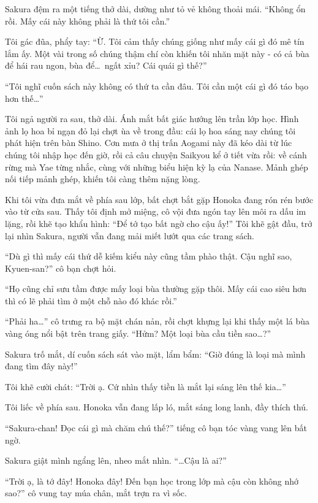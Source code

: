 \documentclass[../main.tex]{subfiles}
\begin{document}
Sakura đệm ra một tiếng thở dài, dường như tỏ vẻ không thoải mái. ``Không ổn rồi. Mấy cái này không phải là thứ tôi cần.''

Tôi gác đũa, phẩy tay: ``Ừ. Tôi cảm thấy chúng giống như mấy cái gì đó mê tín lắm ấy. Một vài trong số chúng thậm chí còn khiến tôi nhăn mặt này - có cả bùa để hái rau ngon, bùa để\dots\ ngất xỉu? Cái quái gì thế?''

``Tôi nghĩ cuốn sách này không có thứ ta cần đâu. Tôi cần một cái gì đó táo bạo hơn thế\dots''

Tôi ngả người ra sau, thở dài. Ánh mắt bất giác hướng lên trần lớp học. Hình ảnh lọ hoa bỉ ngạn đỏ lại chợt ùa về trong đầu: cái lọ hoa sáng nay chúng tôi phát hiện trên bàn Shino. Cơn mưa ở thị trấn Aogami này đã kéo dài từ lúc chúng tôi nhập học đến giờ, rồi cả câu chuyện Saikyou kể ở tiết vừa rồi: về cánh rừng mà Yae từng nhắc, cùng với những biểu hiện kỳ lạ của Nanase. Mảnh ghép nối tiếp mảnh ghép, khiến tôi càng thêm nặng lòng.

Khi tôi vừa đưa mắt về phía sau lớp, bất chợt bắt gặp Honoka đang rón rén bước vào từ cửa sau. Thấy tôi định mở miệng, cô vội đưa ngón tay lên môi ra dấu im lặng, rồi khẽ tạo khẩu hình: ``Để tớ tạo bất ngờ cho cậu ấy!'' Tôi khẽ gật đầu, trở lại nhìn Sakura, người vẫn đang mải miết lướt qua các trang sách.

``Dù gì thì mấy cái thứ dễ kiếm kiểu này cũng tầm phào thật. Cậu nghĩ sao, Kyuen-san?'' cô bạn chợt hỏi.

``Họ cũng chỉ sưu tầm được mấy loại bùa thường gặp thôi. Mấy cái cao siêu hơn thì có lẽ phải tìm ở một chỗ nào đó khác rồi.''

``Phải ha\dots'' cô trưng ra bộ mặt chán nản, rồi chợt khựng lại khi thấy một lá bùa vàng óng nổi bật trên trang giấy. ``Hửm? Một loại bùa cầu tiền sao\dots?''

Sakura trố mắt, dí cuốn sách sát vào mặt, lẩm bẩm: ``Giờ đúng là loại mà mình đang tìm đây này!''

Tôi khẽ cười chát: ``Trời ạ. Cứ nhìn thấy tiền là mắt lại sáng lên thế kia\dots''

Tôi liếc về phía sau. Honoka vẫn đang lấp ló, mắt sáng long lanh, đầy thích thú.

``Sakura-chan! Đọc cái gì mà chăm chú thế?'' tiếng cô bạn tóc vàng vang lên bất ngờ.

Sakura giật mình ngẩng lên, nheo mắt nhìn. ``\dots Cậu là ai?''

``Trời ạ, là tớ đây! Honoka đây! Đến bạn học trong lớp mà cậu còn không nhớ sao?'' cô vung tay múa chân, mắt trợn ra vì sốc.
\end{document}
